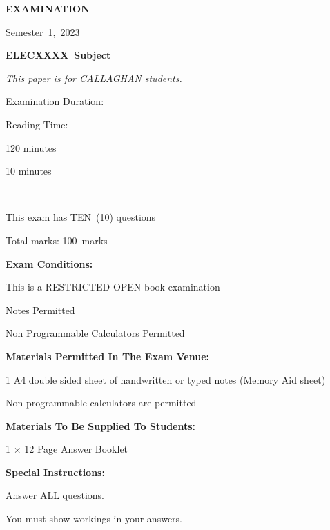 \documentclass[a4paper,12pt]{article}
\newcommand{\semester}{1} %
\newcommand{\examyear}{2023} %
\newcommand{\subjectname}{Subject} %
\newcommand{\modulecode}{ELECXXXX} %
\newcommand{\totalqn}{TEN~(10)} %
\newcommand{\totalmarks}{100} %
\newcounter{question}[section]
\begin{document}
\begin{doublespace}
\begin{center}
    \textbf{\large EXAMINATION}

    
    \textnormal{\footnotesize Semester~\semester,~\examyear}

    
    \textbf{\large \modulecode~\subjectname}


    \textit{\footnotesize This paper is for CALLAGHAN students.}
  \end{center}

  {\footnotesize

    \begin{minipage}[t]{0.33\linewidth}
      
      \footnotesize

      Examination Duration:

      Reading Time:

    \end{minipage}
    \begin{minipage}[t]{0.3\linewidth}
      
      \footnotesize

      120 minutes

      10 minutes

    \end{minipage}\\

    \vspace{-1mm}

    This exam has \underline{\totalqn} questions
    
    Total marks: \totalmarks~marks


    \textbf{Exam Conditions:}

    This is a RESTRICTED OPEN book examination

    Notes Permitted

    Non Programmable Calculators Permitted


    \textbf{Materials Permitted In The Exam Venue:}

    1 A4 double sided sheet of handwritten or typed notes (Memory Aid sheet)

    Non programmable calculators are permitted


    \textbf{Materials To Be Supplied To Students:}

    1 $\times$ 12 Page Answer Booklet


    \textbf{Special Instructions:}
    
    Answer ALL questions.
    
    You must show workings in your answers.

    {\ }}
\end{doublespace}
\end{document}
